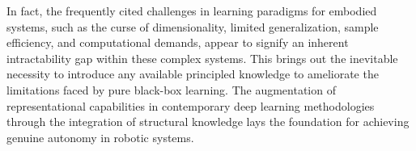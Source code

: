 \documentclass[12pt, a4paper]{article}
\newcommand{\redtext}[1]{\textcolor{red}{#1}}
\begin{document}
In fact, the frequently cited challenges in learning paradigms for embodied systems, such as the curse of dimensionality, limited generalization, sample efficiency, and computational demands, appear to signify an inherent intractability gap within these complex systems. This brings out the inevitable necessity to introduce any available principled knowledge to ameliorate the limitations faced by pure black-box learning. The augmentation of representational capabilities in contemporary deep learning methodologies through the integration of structural knowledge lays the foundation for achieving genuine autonomy in robotic systems.
\end{document}
